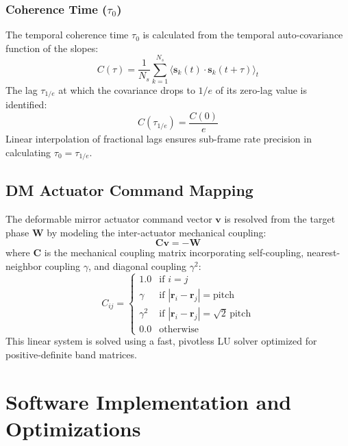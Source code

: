 \documentclass[10pt,journal,compsoc]{IEEEtran}
\begin{document}
\subsubsection{Coherence Time ($\tau_0$)}
The temporal coherence time $\tau_0$ is calculated from the temporal auto-covariance function of the slopes:
\begin{equation}
C(\tau) = \frac{1}{N_s} \sum_{k=1}^{N_s} \langle \bm{s}_k(t) \cdot \bm{s}_k(t+\tau) \rangle_t
\end{equation}
The lag $\tau_{1/e}$ at which the covariance drops to $1/e$ of its zero-lag value is identified:
\begin{equation}
C(\tau_{1/e}) = \frac{C(0)}{e}
\end{equation}
Linear interpolation of fractional lags ensures sub-frame rate precision in calculating $\tau_0 = \tau_{1/e}$.

\subsection{DM Actuator Command Mapping}
The deformable mirror actuator command vector $\bm{v}$ is resolved from the target phase $\bm{W}$ by modeling the inter-actuator mechanical coupling:
\begin{equation}
\bm{C} \bm{v} = -\bm{W}
\end{equation}
where $\bm{C}$ is the mechanical coupling matrix incorporating self-coupling, nearest-neighbor coupling $\gamma$, and diagonal coupling $\gamma^2$:
\begin{equation}
C_{ij} = \begin{cases} 
1.0 & \text{if } i = j \\ 
\gamma & \text{if } |\bm{r}_i - \bm{r}_j| = \text{pitch} \\ 
\gamma^2 & \text{if } |\bm{r}_i - \bm{r}_j| = \sqrt{2}\,\text{pitch} \\ 
0.0 & \text{otherwise} 
\end{cases}
\end{equation}
This linear system is solved using a fast, pivotless LU solver optimized for positive-definite band matrices.

\section{Software Implementation and Optimizations}
\label{sec:implementation}
\end{document}
